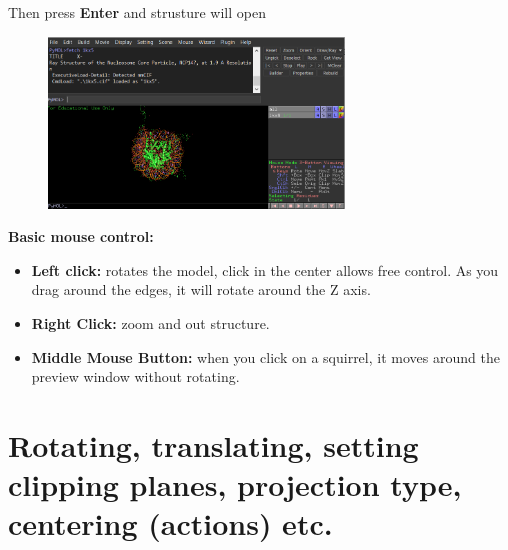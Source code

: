 \documentclass{article}
\begin{document}
Then press \textbf{Enter} and strusture will open \\

\begin{figure}[H]
    \centering
    \includegraphics[width=0.7\textwidth]{workshops/pymol/imgs/imgview1.png}
    \caption[]{}
    \label{view1}
\end{figure}

\begin{center}
    \textbf{Basic mouse control:}
\end{center}

\begin{itemize}
\item \textbf{Left click:} rotates the model, click in the center allows free control. As you drag around the edges, it will rotate around the Z axis.

\item \textbf{Right Click:} zoom and out structure.

\item \textbf{Middle Mouse Button:} when you click on a squirrel, it moves around the preview window without rotating.

\end{itemize}





\section{Rotating, translating, setting clipping planes, projection type, centering (actions) etc.}
\end{document}
